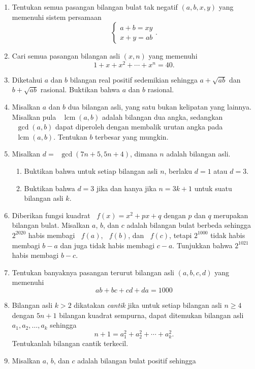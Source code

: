 \documentclass[12pt]{article}
\newcommand*\func[2]{\mathop{}\!{#1}{\left({#2}\right)}}
\DeclareMathOperator{\lcm}{lcm}				%
\begin{document}
\begin{enumerate}[leftmargin=*]
		\item Tentukan semua pasangan bilangan bulat tak negatif $ \left(a, b, x, y\right) $ yang memenuhi sistem persamaan
		\[
			\begin{cases}
				a + b = xy \\
				x + y = ab
			\end{cases}.
		\]
		\item Cari semua pasangan bilangan asli $ \left(x, n\right) $ yang memenuhi
		\[ 1 + x + x^{2} + \cdots + x^{n} = 40. \]
		\item Diketahui $ a $ dan $ b $ bilangan real positif sedemikian sehingga $ a + \sqrt{ab} $ dan $ b + \sqrt{ab} $ rasional. Buktikan bahwa $ a $ dan $ b $ rasional.
		\item Misalkan $ a $ dan $ b $ dua bilangan asli, yang satu bukan kelipatan yang lainnya. Misalkan pula $ \func{\lcm}{a, b} $ adalah bilangan dua angka, sedangkan $ \func{\gcd}{a, b} $ dapat diperoleh dengan membalik urutan angka pada $ \func{\lcm}{a, b} $. Tentukan $ b $ terbesar yang mungkin.
		\item Misalkan $ d = \func{\gcd}{7n + 5, 5n + 4} $, dimana $ n $ adalah bilangan asli.
		\begin{enumerate}
			\item Buktikan bahwa untuk setiap bilangan asli $ n $, berlaku $ d = 1 $ atau $ d = 3 $.
			\item Buktikan bahwa $ d = 3 $ jika dan hanya jika $ n = 3k + 1 $ untuk suatu bilangan asli $ k $.
		\end{enumerate}
		\item Diberikan fungsi kuadrat $ \func{f}{x} = x^{2} + px + q $ dengan $ p $ dan $ q $ merupakan bilangan bulat. Misalkan $ a $, $ b $, dan $ c $ adalah bilangan bulat berbeda sehingga $ 2^{2020} $ habis membagi $ \func{f}{a} $, $ \func{f}{b} $, dan $ \func{f}{c} $, tetapi $ 2^{1000} $ tidak habis membagi $ b - a $ dan juga tidak habis membagi $ c - a $. Tunjukkan bahwa $ 2^{1021} $ habis membagi $ b - c $.
		\item Tentukan banyaknya pasangan terurut bilangan asli $ \left(a, b, c, d\right) $ yang memenuhi
		\[ ab + bc + cd + da = 1000 \]
		\item Bilangan asli $ k > 2 $ dikatakan \textit{cantik} jika untuk setiap bilangan asli $ n \geq 4 $ dengan $ 5n + 1 $ bilangan kuadrat sempurna, dapat ditemukan bilangan asli $ a_{1}, a_{2}, \dots, a_{k} $ sehingga
		\[ n + 1 = a_{1}^{2} + a_{2}^{2} + \cdots + a_{k}^{2}. \]
		Tentukanlah bilangan cantik terkecil.
		\item Misalkan $ a $, $ b $, dan $ c $ adalah bilangan bulat positif sehingga

\end{enumerate}
\end{document}
